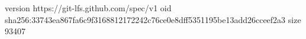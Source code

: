 version https://git-lfs.github.com/spec/v1
oid sha256:33743ea867fa6c9f3168812172242c76ce0e8dff5351195be13add26cceef2a3
size 93407
